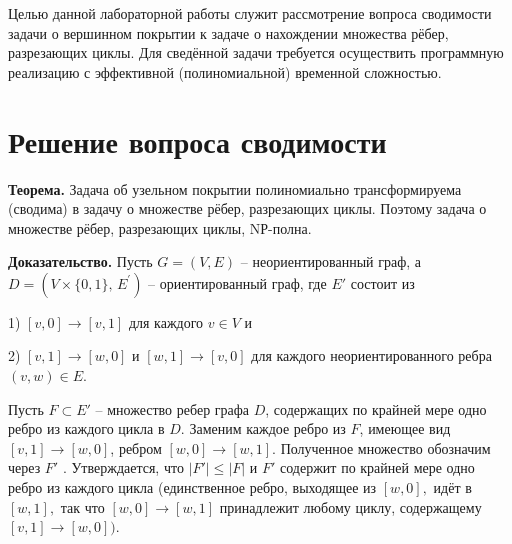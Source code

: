 \documentclass[spec, och, otchet, hidelinks]{SCWorks}
\begin{document}


\tableofcontents






\intro

Целью данной лабораторной работы служит рассмотрение вопроса сводимости задачи о вершинном покрытии к задаче о нахождении множества рёбер, разрезающих 
циклы. Для сведённой задачи требуется осуществить программную реализацию с эффективной (полиномиальной) временной сложностью.

\newpage

\section*{Решение вопроса сводимости}

\textbf{Теорема.} Задача об узельном покрытии полиномиально
трансформируема (сводима) в задачу о множестве рёбер, разрезающих циклы. Поэтому задача о множестве рёбер, разрезающих циклы, NР-полна.
\par \textbf{Доказательство.} Пусть $G=(V, E)$ -- неориентирован­ный граф, а $D = (V \times \{ 0, 1\}, \, E^{\prime}) $ -- ориентированный граф, где $E'$ состоит из 

\par 1) $[v, 0] \rightarrow [v, 1]$ для каждого $v \in V$ и

\par 2) $[v, 1] \rightarrow [w, 0]$ и $[w, 1] \rightarrow [v, 0]$ для каждого неориентирован­ного ребра $(v, w) \in E$.

\par Пусть $F \subset E'$ -- множество ребер графа $D$, содержащих по край­ней мере одно ребро из каждого цикла в $D$. Заменим каждое ребро из $F$, 
имеющее вид $[v, 1] \rightarrow [w, 0]$, ребром $[w, 0] \rightarrow [w, 1]$. Полученное множество обозначим через $F'$ . Утверждается, что $|F'| \leq 
|F|$ и $F'$ содержит по крайней мере одно ребро из каждого цикла (единственное ребро, выходящее из $[w, 0],$ идёт в $[w, 1],$ так что $[w, 0] \rightarrow
[w, 1]$ принадлежит любому циклу, содержащему $[v, 1] \rightarrow [w, 0]).$
\end{document}
